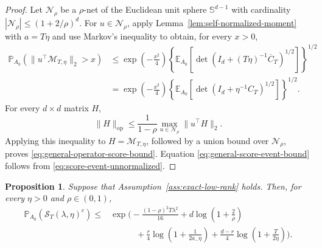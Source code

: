\documentclass[11pt]{article}
\newtheorem{proposition}[theorem]{Proposition}
\begin{document}
\begin{proof}
Let $\mathcal N_\rho$ be a $\rho$-net of the Euclidean unit sphere
$\mathbb S^{d-1}$ with cardinality
$|\mathcal N_\rho|\leq(1+2/\rho)^d$. For $u\in\mathcal N_\rho$, apply
Lemma~\ref{lem:self-normalized-moment} with $a=T\eta$ and use Markov's
inequality to obtain, for every $x>0$,
\begin{align*}
    \mathbb P_{A_0}\!\left(
        \|u^\top\mathcal M_{T,\eta}\|_2>x
    \right)
    &\leq
    \exp\!\left(-\frac{x^2}{4}\right)
    \left\{
        \mathbb E_{A_0}\!\left[
            \det\!\left(
                I_d+(T\eta)^{-1}\overline C_T
            \right)^{1/2}
        \right]
    \right\}^{1/2} \\
    &=
    \exp\!\left(-\frac{x^2}{4}\right)
    \left\{
        \mathbb E_{A_0}\!\left[
            \det\!\left(I_d+\eta^{-1}C_T\right)^{1/2}
        \right]
    \right\}^{1/2}.
\end{align*}
For every $d\times d$ matrix $H$,
\[
    \|H\|_{\mathrm{op}}
    \leq \frac{1}{1-\rho}
    \max_{u\in\mathcal N_\rho}\|u^\top H\|_2.
\]
Applying this inequality to $H=\mathcal M_{T,\eta}$, followed by a union
bound over $\mathcal N_\rho$, proves
\eqref{eq:general-operator-score-bound}. Equation
\eqref{eq:general-score-event-bound} follows from
\eqref{eq:score-event-unnormalized}.
\end{proof}


\begin{proposition}%
\label{prop:exact-low-rank-score-control}
Suppose that Assumption~\ref{ass:exact-low-rank} holds. Then, for every
$\eta>0$ and $\rho\in(0,1)$,
\begin{equation}
\begin{aligned}
    \mathbb P_{A_0}\!\left(
        \mathcal S_T(\lambda,\eta)^c
    \right)
    \leq{}&
    \exp\!\Bigg(
        -\frac{(1-\rho)^2T\lambda^2}{16}
        +d\log\!\left(1+\frac2\rho\right) \\
    &\qquad\quad
        +\frac r4\log\!\left(1+\frac{1}{2a_-\eta}\right)
        +\frac{d-r}{4}\log\!\left(1+\frac{T}{2\eta}\right)
    \Bigg).
\end{aligned}
\label{eq:sharpened-score-event-bound}
\end{equation}
\end{proposition}
\end{document}
